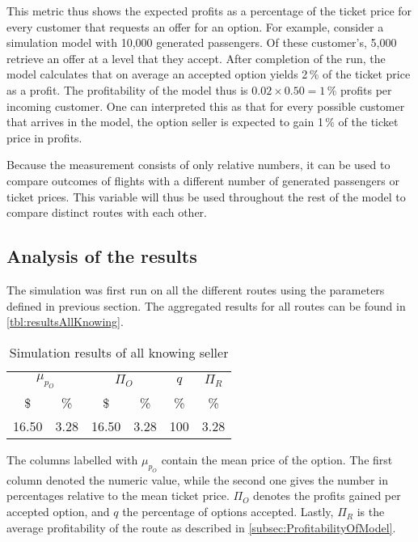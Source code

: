 This metric thus shows the expected profits as a percentage of the ticket price for every customer that requests an offer for an option. For example, consider a simulation model with 10,000 generated passengers. Of these customer's, 5,000 retrieve an offer at a level that they accept. After completion of the run, the model calculates that on average an accepted option yields 2\,\% of the ticket price as a profit. The profitability of the model thus is $0.02 \times 0.50 = 1\,\%$ profits per incoming customer. One can interpreted this as that for every possible customer that arrives in the model, the option seller is expected to gain 1\,\% of the ticket price in profits.

Because the measurement consists of only relative numbers, it can be used to compare outcomes of flights with a different number of generated passengers or ticket prices. This variable will thus be used throughout the rest of the model to compare distinct routes with each other.


\subsection{Analysis of the results}
\label{subsec:AnalysisPerfectInformation}
The simulation was first run on all the different routes using the parameters defined in previous section. The aggregated results for all routes can be found in \autoref{tbl:resultsAllKnowing}.


\begin{table}
\begin{center}
\begin{tabular}{c c | c c | c | c }
\toprule
    \multicolumn{2}{c|}{$\mu_{p_O}$} & \multicolumn{2}{c|}{$\Pi_O$}  &  $q$  & $\Pi_R$ \\[.4ex]
    \$  & \%  &  \$  & \%  & \%  & \% \\
    \midrule
16.50  &    3.28  &   16.50   &    3.28  &   100  &   3.28 \\
    \bottomrule
\end{tabular}
\caption{Simulation results of all knowing seller}
\label{tbl:resultsAllKnowing}
\end{center}
\end{table}


The columns labelled with $\mu_{p_O}$ contain the mean price of the option. The first column denoted the numeric value, while the second one gives the number in percentages relative to the mean ticket price. $\Pi_O$ denotes the profits gained per accepted option, and $q$ the percentage of options accepted. Lastly, $\Pi_R$ is the average profitability of the route as described in \autoref{subsec:ProfitabilityOfModel}.

